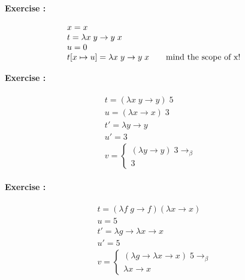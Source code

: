 \documentclass[10pt,a4paper]{article}
\newcounter{ExerciseCount}
\newcommand{\exercise}[1]{\noindent \textbf{Exercise \theExerciseCount:}
  
  \vspace{0.15cm}
 #1 \addtocounter{ExerciseCount}{1}
}
\begin{document}
\exercise{
   \begin{align*}
      \begin{array}{l}
        x = x\\
        t = \lambda x \; y \rightarrow y \; x\\
        u = 0\\
        t[x \mapsto u] = \lambda x \; y \rightarrow y \; x \text{\quad\quad mind the scope of x! }\\
        \end{array} 
    \end{align*}
}

\exercise{
  \begin{align*}
  \begin{array}{l}
     t = (\lambda x \; y \rightarrow y) \; 5 \\
     u = (\lambda x \rightarrow x) \; 3 \\
     t' = \lambda y \rightarrow y \\
     u'= 3 \\
     v = 
      \left \lbrace
      \begin{array}{l}
      (\lambda y \rightarrow y) \; 3 \rightarrow_\beta \quad\\
      3 
      \end{array} \right.
   \end{array}
  \end{align*}
}

\exercise{
  \begin{align*}
    \begin{array}{l}
       t = (\lambda f \; g \rightarrow f) (\lambda x \rightarrow x)\\
       u = 5 \\
       t' = \lambda g \rightarrow \lambda x \rightarrow x \\
       u'= 5 \\
       v = \left \lbrace \begin{array}{l}
          (\lambda g \rightarrow \lambda x \rightarrow x) \; 5 \rightarrow_{\beta}\\
          \lambda x \rightarrow x
          \end{array} \right.
     \end{array}
    \end{align*}
}
\end{document}
